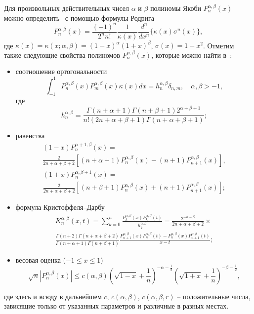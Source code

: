 Для произвольных действительных чисел $\alpha$ и $\beta$ полиномы Якоби $P_n^{\alpha,\beta}(x)$ можно определить~\cite{Ram-Sege} с помощью формулы Родрига
$$
P_n^{\alpha,\beta}(x)=\frac{(-1)^n}{2^nn!}\frac{1}{\kappa(x)}\frac{d^n}{dx^n}\{\kappa(x)\sigma^n(x)\},
$$
где $\kappa(x)=\kappa(x;\alpha,\beta)=(1-x)^\alpha(1+x)^\beta$, $\sigma(x)=1-x^2$. Отметим также следующие свойства полиномов $P_n^{\alpha,\beta}(x)$, которые можно найти в~\cite{Ram-Sege}:
\begin{itemize}
	\item
	соотношение ортогональности
	$$
	\int_{-1}^{1}P_n^{\alpha,\beta}(x)P_m^{\alpha,\beta}(x)\kappa(x)dx=h_n^{\alpha,\beta}\delta_{n,m},\quad \alpha, \beta>-1,
	$$
	где
	$$
	h_n^{\alpha,\beta}=\frac{\Gamma(n+\alpha+1)\Gamma(n+\beta+1)2^{\alpha+\beta+1}}{n!(2n+\alpha+\beta+1)\Gamma(n+\alpha+\beta+1)};
	$$
	
	\item
	равенства
	\begin{multline}\label{alpha_1}
		(1-x)P_n^{\alpha+1,\beta}(x)=\\
		\frac{2}{2n+\alpha+\beta+2}\left[(n+\alpha+1)P_n^{\alpha,\beta}(x)-(n+1)P_{n+1}^{\alpha,\beta}(x)\right],
	\end{multline}
	\begin{multline}\label{beta_1}
		(1+x)P_n^{\alpha,\beta+1}(x)=\\
		\frac{2}{2n+\alpha+\beta+2}\left[(n+\beta+1)P_n^{\alpha,\beta}(x)+(n+1)P_{n+1}^{\alpha,\beta}(x)\right];
	\end{multline}
	
	\item
	формула Кристоффеля--Дарбу
	\begin{multline}\label{Kris_Dar}
		K_n^{\alpha,\beta}(x,t)=\sum_{k=0}^{n}\frac{P_k^{\alpha,\beta}(x)P_k^{\alpha,\beta}(t)}{h_k^{\alpha,\beta}}=\frac{2^{-\alpha-\beta}}{2n+\alpha+\beta+2}\times\\
		\frac{\Gamma(n+2)\Gamma(n+\alpha+\beta+2)}{\Gamma(n+\alpha+1)\Gamma(n+\beta+1)}
		\frac{P_{n+1}^{\alpha,\beta}(x)P_n^{\alpha,\beta}(t)-P_n^{\alpha,\beta}(x)P_{n+1}^{\alpha,\beta}(t)}{x-t};
	\end{multline}
	
	\item
	весовая оценка ($-1\le x\le1$)
	\begin{equation*}
		\sqrt{n}|P_n^{\alpha,\beta}(x)|\le c(\alpha,\beta)\left(\sqrt{1-x}+\frac{1}{n}\right)^{-\alpha-\frac12}
		\left(\sqrt{1+x}+\frac{1}{n}\right)^{-\beta-\frac12},
	\end{equation*}
\end{itemize}
где здесь и всюду в дальнейшем $c$, $c(\alpha,\beta)$, $c(\alpha,\beta,r)$ -- положительные числа, зависящие только от указанных параметров и различные в разных местах.

